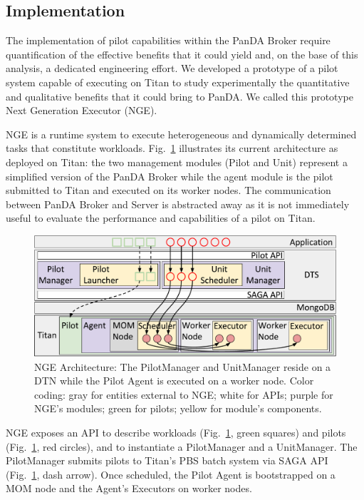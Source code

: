 \subsection{Implementation}\label{sec:arch}

The implementation of pilot capabilities within the PanDA Broker require
quantification of the effective benefits that it could yield and, on the base
of this analysis, a dedicated engineering effort. We developed a prototype of
a pilot system capable of executing on Titan to study experimentally the
quantitative and qualitative benefits that it could bring to PanDA\@. We
called this prototype Next Generation Executor (NGE).

NGE is a runtime system to execute heterogeneous and dynamically determined
tasks that constitute workloads. Fig.~\ref{fig:arch-overview} illustrates its
current architecture as deployed on Titan: the two management modules (Pilot
and Unit) represent a simplified version of the PanDA Broker while the agent
module is the pilot submitted to Titan and executed on its worker nodes. The
communication between PanDA Broker and Server is abstracted away as it is not
immediately useful to evaluate the performance and capabilities of a pilot on
Titan.

\begin{figure}
  \centering
	\includegraphics[width=\columnwidth]{rp_architecture_compact_atlaswms_paper.pdf}
	\vspace{-0.3in}
	\caption{NGE Architecture: The PilotManager and UnitManager reside on a
  	DTN while the Pilot Agent is executed on a worker node. Color coding:
  	gray for entities external to NGE\@; white for APIs; purple for NGE's
  	modules; green for pilots; yellow for module's components.}
\label{fig:arch-overview}
\end{figure}

NGE exposes an API to describe workloads (Fig.~\ref{fig:arch-overview}, green
squares) and pilots (Fig.~\ref{fig:arch-overview}, red circles), and to
instantiate a PilotManager and a UnitManager. The PilotManager submits pilots
to Titan's PBS batch system via SAGA API (Fig.~\ref{fig:arch-overview}, dash
arrow). Once scheduled, the Pilot Agent is bootstrapped on a MOM node and the
Agent's Executors on worker nodes.

